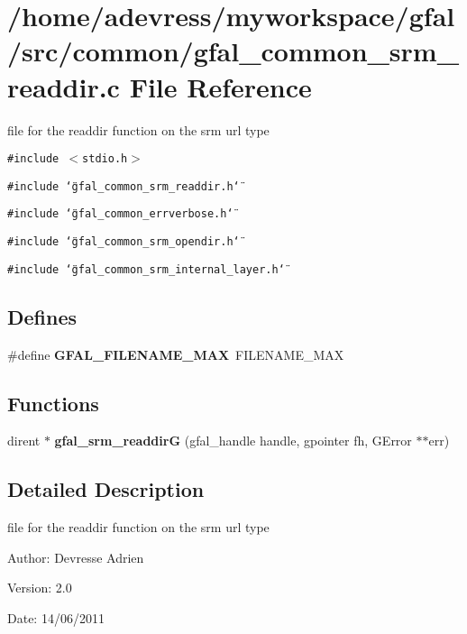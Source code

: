 \section{/home/adevress/myworkspace/gfal/src/common/gfal\_\-common\_\-srm\_\-readdir.c File Reference}
\label{gfal__common__srm__readdir_8c}
file for the readdir function on the srm url type 

{\tt \#include $<$stdio.h$>$}\par
{\tt \#include \char`\"{}gfal\_\-common\_\-srm\_\-readdir.h\char`\"{}}\par
{\tt \#include \char`\"{}gfal\_\-common\_\-errverbose.h\char`\"{}}\par
{\tt \#include \char`\"{}gfal\_\-common\_\-srm\_\-opendir.h\char`\"{}}\par
{\tt \#include \char`\"{}gfal\_\-common\_\-srm\_\-internal\_\-layer.h\char`\"{}}\par
\subsection*{Defines}
\begin{CompactItemize}
\item 
\#define \textbf{GFAL\_\-FILENAME\_\-MAX}~FILENAME\_\-MAX\label{gfal__common__srm__readdir_8c_595a5b00305895e25ce0e00b177fd8a8}

\end{CompactItemize}
\subsection*{Functions}
\begin{CompactItemize}
\item 
dirent $\ast$ \textbf{gfal\_\-srm\_\-readdir\-G} (gfal\_\-handle handle, gpointer fh, GError $\ast$$\ast$err)\label{gfal__common__srm__readdir_8c_33c8825f86ee48c66f13e778a2bc1b31}

\end{CompactItemize}


\subsection{Detailed Description}
file for the readdir function on the srm url type 

\begin{Desc}
\item[Author:]Devresse Adrien \end{Desc}
\begin{Desc}
\item[Version:]2.0 \end{Desc}
\begin{Desc}
\item[Date:]14/06/2011 \end{Desc}
